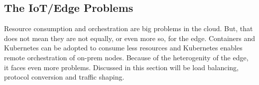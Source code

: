 \subsection{The IoT/Edge Problems}
Resource consumption and orchestration are big problems in the cloud. But, that does not mean they are not equally, or even more so, for the edge. Containers and Kubernetes can be adopted to consume less resources and Kubernetes enables remote orchestration of on-prem nodes. Because of the heterogenity of the edge, it faces even more problems. Discussed in this section will be load balancing, protocol conversion and traffic shaping.





